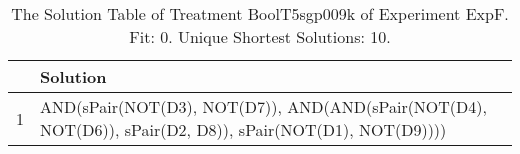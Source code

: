 \begin{table}[ht]
\centering
\begin{tabular}{rp{9cm}}
  \hline
 & Solution \\ 
  \hline
1 & AND(sPair(NOT(D3), NOT(D7)), AND(AND(sPair(NOT(D4), NOT(D6)), sPair(D2, D8)), sPair(NOT(D1), NOT(D9)))) \\ 
   \hline
\end{tabular}
\caption{The Solution Table of Treatment BoolT5sgp009k of Experiment ExpF. Fit: 0. Unique Shortest Solutions: 10.} 
\end{table}
